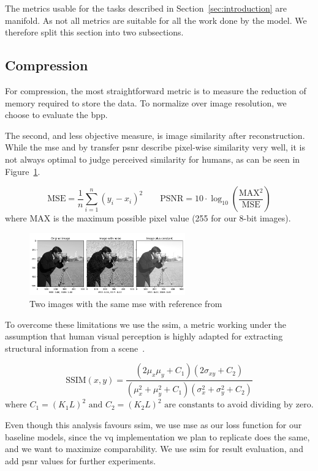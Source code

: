The metrics usable for the tasks described in Section~\ref{sec:introduction} are manifold.
As not all metrics are suitable for all the work done by the model.
We therefore split this section into two subsections.

\subsection{Compression}\label{subsec:compression}
For compression, the most straightforward metric is to measure the reduction of memory required to
store the data.
To normalize over image resolution, we choose to evaluate the \ac{bpp}.

The second, and less objective measure, is image similarity after reconstruction.
While the \ac{mse} and by transfer \ac{psnr} describe pixel-wise similarity very well, it is not
always optimal to judge perceived similarity for humans, as can be seen in Figure~\ref{fig:mse_ssim}.

\[
\text{MSE} = \frac{1}{n} \sum_{i=1}^{n} (y_i - x_i)^2 \quad \quad \text{PSNR} = 10 \cdot \log_{10} \left( \frac{\text{MAX$^2$}}{\text{MSE}} \right)
\]
where $\text{MAX}$ is the maximum possible pixel value (255 for our 8-bit images).

\begin{figure}[ht]
    \centering
    \includegraphics[width=0.6\textwidth]{images/ssim_mse}
    \caption{Two images with the same \ac{mse} with reference from~\cite{scikit-ssim}}
    \label{fig:mse_ssim}
\end{figure}

To overcome these limitations we use the \ac{ssim}, a metric working under the assumption that human visual
perception is highly adapted for extracting structural information from a scene~\cite{ssim}.

\[
\text{SSIM}(x, y) = \frac{(2\mu_x \mu_y + C_1)(2\sigma_{xy} + C_2)}{(\mu_x^2 + \mu_y^2 + C_1)(\sigma_x^2 + \sigma_y^2 + C_2)}
\]
$\text{where } C_1 = (K_1L)^2 \text{ and } C_2 = (K_2L)^2 \text{ are constants to avoid dividing by zero.}$


Even though this analysis favours \ac{ssim}, we use \ac{mse} as our loss function for our baseline models,
since the \ac{vq} implementation we plan to replicate does the same, and we want to maximize comparability.
We use \ac{ssim} for result evaluation, and add \ac{psnr} values for further experiments.

